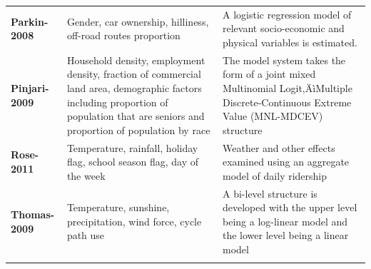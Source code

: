 \documentclass [11pt, proquest] {uwthesis}[2015/03/03]
\begin{document}
\begin{center}
\begin{scriptsize}
\begin{tabular}{p{3cm} p{7cm} p{5cm}}
  \textbf{Parkin-2008} & Gender, car ownership, hilliness, off-road routes proportion & A logistic regression model of relevant socio-economic and physical variables is estimated. \\
  \textbf{Pinjari-2009} & Household density, employment density, fraction of commercial land area, demographic factors including proportion of population that are seniors and proportion of population by race & The model system takes the form of a joint mixed Multinomial Logit‚ÄìMultiple Discrete-Continuous Extreme Value (MNL-MDCEV) structure \\
  \textbf{Rose-2011} & Temperature, rainfall, holiday flag, school season flag, day of the week & Weather and other effects examined using an aggregate model of daily ridership \\
  \textbf{Thomas-2009} & Temperature, sunshine, precipitation, wind force, cycle path use & A bi-level structure is developed with the upper level being a log-linear model and the lower level being a linear model \\ [1ex] 
 \hline
\label{tb:lit}
\end{tabular}
\end{scriptsize}
\end{center}
\end{document}
